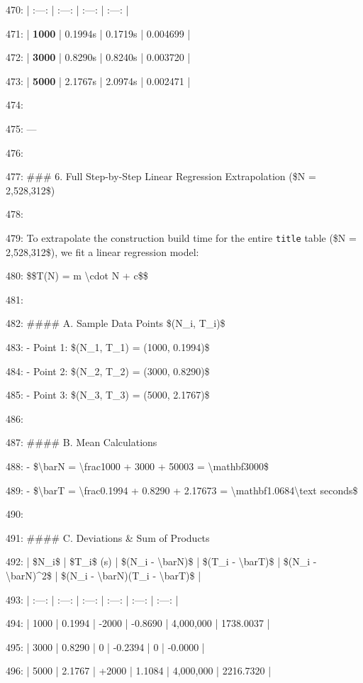 \documentclass[11pt,a4paper]{article}
\begin{document}
470: | :---: | :---: | :---: | :---: |

471: | \textbf{1000} | 0.1994s | 0.1719s | 0.004699 |

472: | \textbf{3000} | 0.8290s | 0.8240s | 0.003720 |

473: | \textbf{5000} | 2.1767s | 2.0974s | 0.002471 |

474:

475: ---

476:

477: \#\#\# 6. Full Step-by-Step Linear Regression Extrapolation (\$N = 2,528,312\$)

478:

479: To extrapolate the construction build time for the entire \texttt{title} table (\$N = 2,528,312\$), we fit a linear regression model:

480: \$\$T(N) = m \textbackslash{}cdot N + c\$\$

481:

482: \#\#\#\# A. Sample Data Points \$(N\_i, T\_i)\$

483: - Point 1: \$(N\_1, T\_1) = (1000, 0.1994)\$

484: - Point 2: \$(N\_2, T\_2) = (3000, 0.8290)\$

485: - Point 3: \$(N\_3, T\_3) = (5000, 2.1767)\$

486:

487: \#\#\#\# B. Mean Calculations

488: - \$\textbackslash{}bar{N} = \textbackslash{}frac{1000 + 3000 + 5000}{3} = \textbackslash{}mathbf{3000}\$

489: - \$\textbackslash{}bar{T} = \textbackslash{}frac{0.1994 + 0.8290 + 2.1767}{3} = \textbackslash{}mathbf{1.0684\textbackslash{}text{ seconds}}\$

490:

491: \#\#\#\# C. Deviations \& Sum of Products

492: | \$N\_i\$ | \$T\_i\$ (s) | \$(N\_i - \textbackslash{}bar{N})\$ | \$(T\_i - \textbackslash{}bar{T})\$ | \$(N\_i - \textbackslash{}bar{N})\textasciicircum{}2\$ | \$(N\_i - \textbackslash{}bar{N})(T\_i - \textbackslash{}bar{T})\$ |

493: | :---: | :---: | :---: | :---: | :---: | :---: |

494: | 1000 | 0.1994 | -2000 | -0.8690 | 4,000,000 | 1738.0037 |

495: | 3000 | 0.8290 | 0 | -0.2394 | 0 | -0.0000 |

496: | 5000 | 2.1767 | +2000 | 1.1084 | 4,000,000 | 2216.7320 |
\end{document}
